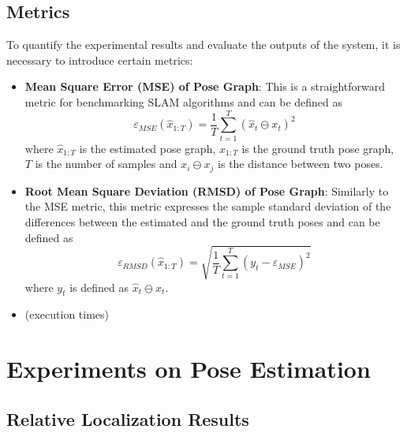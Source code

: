 
\subsection{Metrics}

To quantify the experimental results and evaluate the outputs of the system,
it is necessary to introduce certain metrics:
\begin{itemize}
    \item \textbf{Mean Square Error (MSE) of Pose Graph}:
        This is a straightforward metric for benchmarking SLAM algorithms
        and can be defined as
        \begin{equation}
            \varepsilon_{MSE} (\hat{x}_{1:T}) = \frac{1}{T}
            \sum\limits_{t=1}^T (\hat{x}_t \ominus x_t)^2
        \end{equation}
        where
        $\hat{x}_{1:T}$ is the estimated pose graph,
        $x_{1:T}$ is the ground truth pose graph,
        $T$ is the number of samples and
        $x_i \ominus x_j$ is the distance between two poses.


    \item \textbf{Root Mean Square Deviation (RMSD) of Pose Graph}:
        Similarly to the MSE metric, this metric expresses the sample
        standard deviation of the differences between the estimated and the
        ground truth poses and can be defined as
        \begin{equation}
            \varepsilon_{RMSD} (\hat{x}_{1:T}) = \sqrt{\frac{1}{T}
            \sum\limits_{t=1}^T (y_t - \varepsilon_{MSE})^2}
        \end{equation}
        where $y_t$ is defined as $\hat{x}_t \ominus x_t$.

    \item (execution times)
\end{itemize}

\section{Experiments on Pose Estimation}

\subsection{Relative Localization Results}

